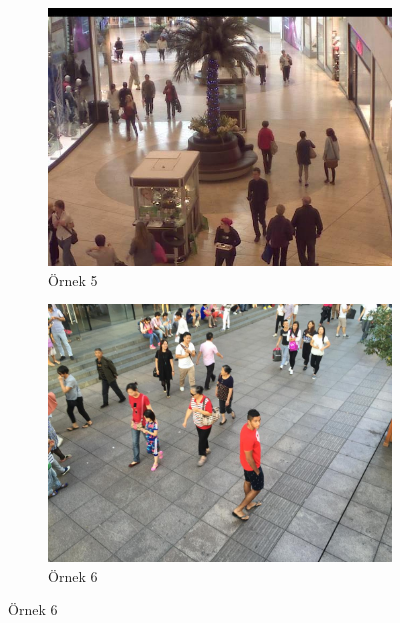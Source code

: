 \documentclass[10pt,a4paper]{report}
\begin{document}
	\begin{figure}[!h]
		\begin{subfigure}{\textwidth}
			\raggedright
			\includegraphics[width=\textwidth]{ornek5.jpg}
			\caption{Örnek 5}
			\label{Ornek5}
		\end{subfigure}
		\begin{subfigure}{\textwidth}
			\raggedright
			\includegraphics[width=\textwidth]{ornek6.jpg}
			\caption{Örnek 6}
			\label{Ornek6}
		\end{subfigure}
	\end{figure}
		
\end{document}
